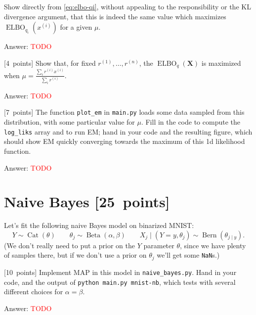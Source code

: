 \documentclass{article}
\newcommand{\ask}[1]{\textcolor{question}{#1}}
\newenvironment{answer}{\par\begingroup\color{answer}Answer: }{\endgroup}
\newcommand{\red}[1]{\textcolor{red}{#1}}
\newcommand{\pts}[1]{\textcolor{points}{[#1~points]}}
\newcommand{\TODO}{\red{TODO}}
\DeclareMathOperator{\Bern}{Bern}
\DeclareMathOperator{\Cat}{Cat}
\DeclareMathOperator{\ELBO}{ELBO}
\newcommand{\bX}{\mathbf{X}}
\newcommand{\toth}[1]{^{(#1)}}
\newcommand{\ith}{\toth{i}}
\numberwithin{equation}{section}
\begin{document}
\begin{qlist}[resume]
    \ask{Show directly from \eqref{eq:elbo-qi}, without appealing to the responsibility or the KL divergence argument,
    that this is indeed the same value which maximizes $\ELBO_{q_i}(x\ith)$ for a given $\mu$.}
    \begin{answer}\TODO\end{answer}

    \item \pts{4} \ask{%
        Show that, for fixed $r\toth{1}, \dots, r\toth{n}$, the $\ELBO_q(\bX)$ is maximized when
        $\mu = \frac{\sum_i r\ith x\ith}{\sum_i r\ith}$.
    }
    \begin{answer}\TODO\end{answer}

    \item \pts{7}
      The function \texttt{plot\_em} in \texttt{main.py}
      loads some data sampled from this distribution,
      with some particular value for $\mu$.
      Fill in the code to compute the \texttt{log\_liks} array
      and to run EM;
      \ask{hand in your code and the resulting figure},
      which should show EM quickly converging towards the maximum of this 1d likelihood function.
      \begin{answer}\TODO\end{answer}
\end{qlist}



\clearpage
\section{Naive Bayes \pts{25}}

Let's fit the following naive Bayes model on binarized MNIST:
\[
    Y \sim \Cat(\theta)
    \qquad
    \theta_j \sim \operatorname{Beta}(\alpha, \beta)
    \qquad
    X_j \mid (Y = y, \theta_j) \sim \Bern(\theta_{j \mid y})
.\]
(We don't really need to put a prior on the $Y$ parameter $\theta$, since we have plenty of samples there,
but if we don't use a prior on $\theta_j$ we'll get some \texttt{NaN}s.)

\begin{qlist}


\item \pts{10}
    Implement MAP in this model in \texttt{naive\_bayes.py}. 
    \ask{Hand in your code, and the output of \texttt{python main.py mnist-nb}, which tests with several different choices for $\alpha = \beta$.}

\begin{answer}\TODO\end{answer}


\end{qlist}
\end{document}
